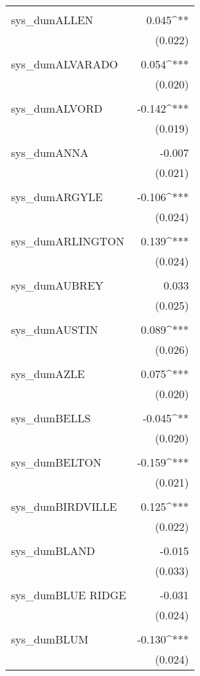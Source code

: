 \begin{table}[!htbp]
\begin{tabular}{@{\extracolsep{5pt}}lD{.}{.}{-3} }
  & \\ 
 sys\_dumALLEN & 0.045^{**} \\ 
  & (0.022) \\ 
  & \\ 
 sys\_dumALVARADO & 0.054^{***} \\ 
  & (0.020) \\ 
  & \\ 
 sys\_dumALVORD & -0.142^{***} \\ 
  & (0.019) \\ 
  & \\ 
 sys\_dumANNA & -0.007 \\ 
  & (0.021) \\ 
  & \\ 
 sys\_dumARGYLE & -0.106^{***} \\ 
  & (0.024) \\ 
  & \\ 
 sys\_dumARLINGTON & 0.139^{***} \\ 
  & (0.024) \\ 
  & \\ 
 sys\_dumAUBREY & 0.033 \\ 
  & (0.025) \\ 
  & \\ 
 sys\_dumAUSTIN & 0.089^{***} \\ 
  & (0.026) \\ 
  & \\ 
 sys\_dumAZLE & 0.075^{***} \\ 
  & (0.020) \\ 
  & \\ 
 sys\_dumBELLS & -0.045^{**} \\ 
  & (0.020) \\ 
  & \\ 
 sys\_dumBELTON & -0.159^{***} \\ 
  & (0.021) \\ 
  & \\ 
 sys\_dumBIRDVILLE & 0.125^{***} \\ 
  & (0.022) \\ 
  & \\ 
 sys\_dumBLAND & -0.015 \\ 
  & (0.033) \\ 
  & \\ 
 sys\_dumBLUE RIDGE & -0.031 \\ 
  & (0.024) \\ 
  & \\ 
 sys\_dumBLUM & -0.130^{***} \\ 
  & (0.024) \\ 

\end{tabular}
\end{table}
